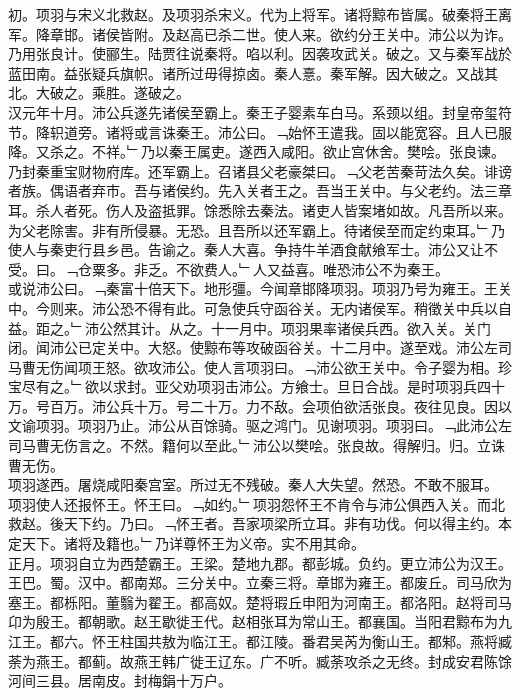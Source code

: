 \documentclass{zhvt-classic}
\begin{document}
\hspace*{2em}初。项羽与宋义北救赵。及项羽杀宋义。代为上将军。诸将黥布皆属。破秦将王离军。降章邯。诸侯皆附。及赵高已杀二世。使人来。欲约分王关中。沛公以为诈。乃用张良计。使郦生。陆贾往说秦将。啗以利。因袭攻武关。破之。又与秦军战於蓝田南。益张疑兵旗帜。诸所过毋得掠卤。秦人憙。秦军解。因大破之。又战其北。大破之。乘胜。遂破之。\\
\hspace*{2em}汉元年十月。沛公兵遂先诸侯至霸上。秦王子婴素车白马。系颈以组。封皇帝玺符节。降轵道旁。诸将或言诛秦王。沛公曰。﹁始怀王遣我。固以能宽容。且人已服降。又杀之。不祥。﹂乃以秦王属吏。遂西入咸阳。欲止宫休舍。樊哙。张良谏。乃封秦重宝财物府库。还军霸上。召诸县父老豪桀曰。﹁父老苦秦苛法久矣。诽谤者族。偶语者弃巿。吾与诸侯约。先入关者王之。吾当王关中。与父老约。法三章耳。杀人者死。伤人及盗抵罪。馀悉除去秦法。诸吏人皆案堵如故。凡吾所以来。为父老除害。非有所侵暴。无恐。且吾所以还军霸上。待诸侯至而定约束耳。﹂乃使人与秦吏行县乡邑。告谕之。秦人大喜。争持牛羊酒食献飨军士。沛公又让不受。曰。﹁仓粟多。非乏。不欲费人。﹂人又益喜。唯恐沛公不为秦王。\\
\hspace*{2em}或说沛公曰。﹁秦富十倍天下。地形彊。今闻章邯降项羽。项羽乃号为雍王。王关中。今则来。沛公恐不得有此。可急使兵守函谷关。无内诸侯军。稍徵关中兵以自益。距之。﹂沛公然其计。从之。十一月中。项羽果率诸侯兵西。欲入关。关门闭。闻沛公已定关中。大怒。使黥布等攻破函谷关。十二月中。遂至戏。沛公左司马曹无伤闻项王怒。欲攻沛公。使人言项羽曰。﹁沛公欲王关中。令子婴为相。珍宝尽有之。﹂欲以求封。亚父劝项羽击沛公。方飨士。旦日合战。是时项羽兵四十万。号百万。沛公兵十万。号二十万。力不敌。会项伯欲活张良。夜往见良。因以文谕项羽。项羽乃止。沛公从百馀骑。驱之鸿门。见谢项羽。项羽曰。﹁此沛公左司马曹无伤言之。不然。籍何以至此。﹂沛公以樊哙。张良故。得解归。归。立诛曹无伤。\\
\hspace*{2em}项羽遂西。屠烧咸阳秦宫室。所过无不残破。秦人大失望。然恐。不敢不服耳。\\
\hspace*{2em}项羽使人还报怀王。怀王曰。﹁如约。﹂项羽怨怀王不肯令与沛公俱西入关。而北救赵。後天下约。乃曰。﹁怀王者。吾家项梁所立耳。非有功伐。何以得主约。本定天下。诸将及籍也。﹂乃详尊怀王为义帝。实不用其命。\\
\hspace*{2em}正月。项羽自立为西楚霸王。王梁。楚地九郡。都彭城。负约。更立沛公为汉王。王巴。蜀。汉中。都南郑。三分关中。立秦三将。章邯为雍王。都废丘。司马欣为塞王。都栎阳。董翳为翟王。都高奴。楚将瑕丘申阳为河南王。都洛阳。赵将司马卬为殷王。都朝歌。赵王歇徙王代。赵相张耳为常山王。都襄国。当阳君黥布为九江王。都六。怀王柱国共敖为临江王。都江陵。番君吴芮为衡山王。都邾。燕将臧荼为燕王。都蓟。故燕王韩广徙王辽东。广不听。臧荼攻杀之无终。封成安君陈馀河间三县。居南皮。封梅鋗十万户。\\
\end{document}
